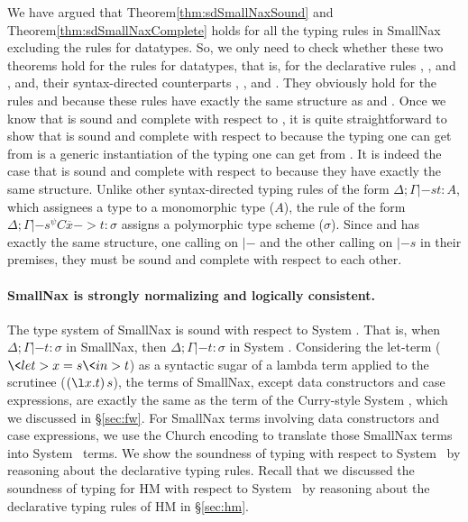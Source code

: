 We have argued that Theorem\;\ref{thm:sdSmallNaxSound} and
Theorem\;\ref{thm:sdSmallNaxComplete} holds for all the typing rules
in SmallNax excluding the rules for datatypes. So, we only need to check
whether these two theorems hold for the rules for datatypes, that is,
for the declarative rules , , and ,
and, their syntax-directed counterparts , ,
and . They obviously hold for the rules  and
 because these rules have exactly the same structure as 
 and . Once we know that  is
sound and complete with respect to , it is quite
straightforward to show that  is sound and complete
with respect to  because the typing one can get
from  is a generic instantiation of the typing
one can get from . It is indeed the case that
 is sound and complete with respect to 
because they have exactly the same structure. Unlike other syntax-directed
typing rules of the form $\Delta;\Gamma |-s t : A$, which
assignees a type to a monomorphic type ($A$), the rule 
of the form $\Delta;\Gamma |-s^\psi C\overline{x} -> t : \sigma$
assigns a polymorphic type scheme ($\sigma$). Since  and
 has exactly the same structure, one calling on $|-$
and the other calling on $|-s$ in their premises, they must be sound
and complete with respect to each other.

\paragraph{SmallNax is strongly normalizing and logically consistent.}
The type system of SmallNax is sound with respect to System \Fw.
That is, when $\Delta;\Gamma |- t:\sigma$ in SmallNax, then 
$\Delta;\Gamma |- t:\sigma$ in System \Fw.
Considering the let-term ($\<let> x=s \<in> t$) as a syntactic sugar of
a lambda term applied to the scrutinee ($(\l x.t)\,s$), the terms of SmallNax,
except data constructors and case expressions, are exactly the same as
the term of the Curry-style System \Fw, which we discussed in \S\ref{sec:fw}.
For SmallNax terms involving data constructors and case expressions, we use
the Church encoding to translate those SmallNax terms into System \Fw\ terms.
We show the soundness of typing with respect to System \Fw\ by reasoning about
the declarative typing rules. Recall that we discussed
the soundness of typing for HM with respect to System \F\ by reasoning about
the declarative typing rules of HM in \S\ref{sec:hm}.

